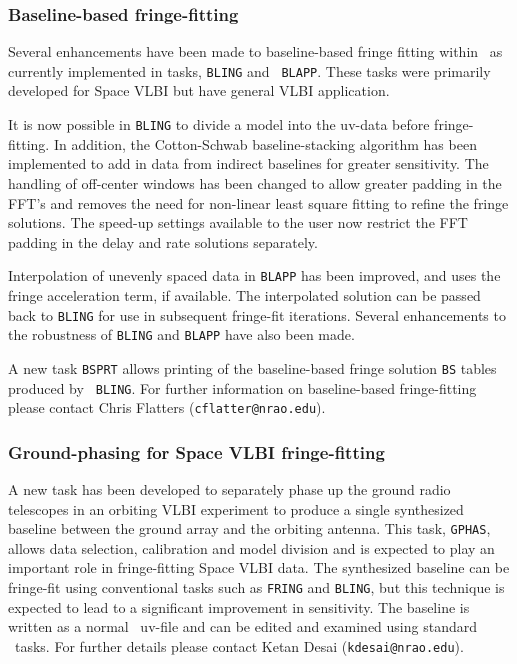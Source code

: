 \subsubsection{Baseline-based fringe-fitting}

Several enhancements have been made to baseline-based fringe fitting
within \AIPS\, as currently implemented in tasks, {\tt BLING} and {\tt
BLAPP}. These tasks were primarily developed for Space VLBI but have
general VLBI application.

It is now possible in {\tt BLING} to divide a model into the uv-data
before fringe-fitting. In addition, the Cotton-Schwab
baseline-stacking algorithm has been implemented to add in data from
indirect baselines for greater sensitivity.  The handling of
off-center windows has been changed to allow greater padding in the
FFT's and removes the need for non-linear least square fitting to
refine the fringe solutions. The speed-up settings available to the
user now restrict the FFT padding in the delay and rate solutions
separately.

Interpolation of unevenly spaced data in {\tt BLAPP} has been
improved, and uses the fringe acceleration term, if available. The
interpolated solution can be passed back to {\tt BLING} for use in
subsequent fringe-fit iterations. Several enhancements to the
robustness of {\tt BLING} and {\tt BLAPP} have also been made.

A new task {\tt BSPRT} allows printing of the
baseline-based fringe solution {\tt BS} tables produced by {\tt
BLING}. For further information on baseline-based fringe-fitting
please contact Chris Flatters ({\tt cflatter@nrao.edu}).

\subsubsection{Ground-phasing for Space VLBI fringe-fitting}

A new task has been developed to separately phase up the ground radio
telescopes in an orbiting VLBI experiment to produce a single
synthesized baseline between the ground array and the orbiting
antenna. This task, {\tt GPHAS}, allows data selection, calibration
and model division and is expected to play an important role in
fringe-fitting Space VLBI data. The synthesized baseline can be
fringe-fit using conventional tasks such as {\tt FRING} and {\tt BLING},
but this technique is expected to lead to a significant improvement in
sensitivity.  The baseline is written as a normal \AIPS\ uv-file and
can be edited and examined using standard \AIPS\ tasks. For further
details please contact Ketan Desai ({\tt kdesai@nrao.edu}).

